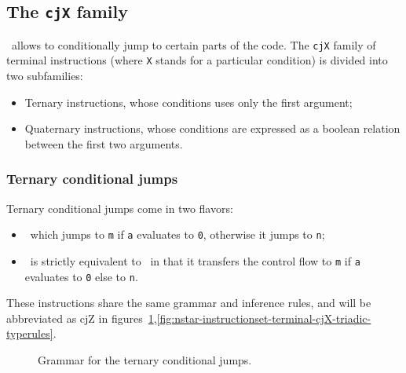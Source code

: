 \subsection{The \texttt{cjX} family}\label{subsec:nstar-instructionset-terminal-cjX}

\nstar\ allows to conditionally jump to certain parts of the code.
The \texttt{cjX} family of terminal instructions (where \texttt{X} stands for a particular condition) is divided into two subfamilies:
\begin{itemize}
	\item Ternary instructions, whose conditions uses only the first argument;
	\item Quaternary instructions, whose conditions are expressed as a boolean relation between the first two arguments.
\end{itemize}

\subsubsection{Ternary conditional jumps}\label{subsubsec:nstar-instructionset-terminal-cjX-triadic}

Ternary conditional jumps come in two flavors:
\begin{itemize}
	\item {}\ which jumps to \texttt{m} if \texttt{a} evaluates to \texttt{0}, otherwise it jumps to \texttt{n};
	\item {}\ is strictly equivalent to \ in that it transfers the control flow to \texttt{m} if \texttt{a} evaluates to \texttt{0} else to \texttt{n}.
\end{itemize}

These instructions share the same grammar and inference rules, and will be abbreviated as {\Iformat cjZ} in figures~\ref{fig:nstar-instructionset-terminal-cjX-triadic-grammar},\ref{fig:nstar-instructionset-terminal-cjX-triadic-typerules}.

\begin{figure}[H]
	\centering


	\caption{Grammar for the ternary conditional jumps.}
	\label{fig:nstar-instructionset-terminal-cjX-triadic-grammar}
\end{figure}

